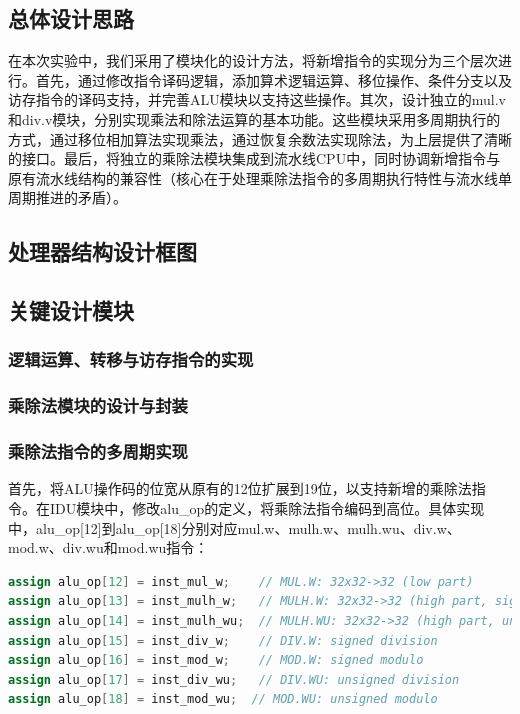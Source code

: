 \documentclass[11pt]{article}
\begin{document}
\subsection{总体设计思路}

在本次实验中，我们采用了模块化的设计方法，将新增指令的实现分为三个层次进行。首先，通过修改指令译码逻辑，添加算术逻辑运算、移位操作、条件分支以及访存指令的译码支持，并完善ALU模块以支持这些操作。其次，设计独立的mul.v和div.v模块，分别实现乘法和除法运算的基本功能。这些模块采用多周期执行的方式，通过移位相加算法实现乘法，通过恢复余数法实现除法，为上层提供了清晰的接口。最后，将独立的乘除法模块集成到流水线CPU中，同时协调新增指令与原有流水线结构的兼容性（核心在于处理乘除法指令的多周期执行特性与流水线单周期推进的矛盾）。

\subsection{处理器结构设计框图}


\subsection{关键设计模块}

\subsubsection{逻辑运算、转移与访存指令的实现}

\subsubsection{乘除法模块的设计与封装}

\subsubsection{乘除法指令的多周期实现}

首先，将ALU操作码的位宽从原有的12位扩展到19位，以支持新增的乘除法指令。在IDU模块中，修改alu\_op的定义，将乘除法指令编码到高位。具体实现中，alu\_op[12]到alu\_op[18]分别对应mul.w、mulh.w、mulh.wu、div.w、mod.w、div.wu和mod.wu指令：

\begin{lstlisting}[language=verilog]
assign alu_op[12] = inst_mul_w;    // MUL.W: 32x32->32 (low part)
assign alu_op[13] = inst_mulh_w;   // MULH.W: 32x32->32 (high part, signed)
assign alu_op[14] = inst_mulh_wu;  // MULH.WU: 32x32->32 (high part, unsigned)
assign alu_op[15] = inst_div_w;    // DIV.W: signed division
assign alu_op[16] = inst_mod_w;    // MOD.W: signed modulo
assign alu_op[17] = inst_div_wu;   // DIV.WU: unsigned division
assign alu_op[18] = inst_mod_wu;  // MOD.WU: unsigned modulo
\end{lstlisting}
\end{document}
